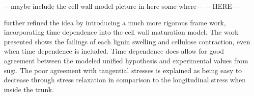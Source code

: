 ---maybe include the cell wall model picture in here some where---
---HERE---


\citet{Yamamoto_1998} further refined the idea by introducing a much more rigorous frame
work, incorporating time dependence into the cell wall maturation model. The
work presented shows the failings of each lignin swelling and cellulose
contraction, even when time dependence is included. Time dependence does allow
for good agreement between the modeled unified hypothesis and experimental
values from sugi. The poor agreement with tangential stresses is
explained as being easy to decrease through stress relaxation in comparison to
the longitudinal stress when inside the trunk.
